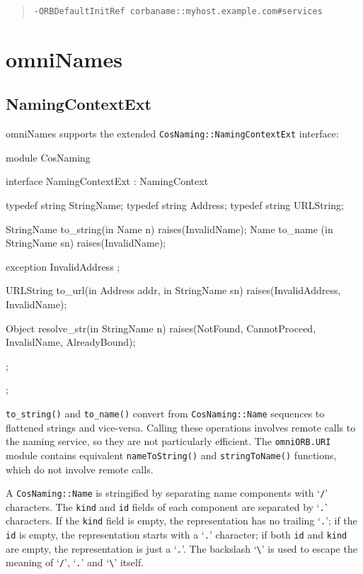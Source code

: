 \documentclass[11pt,oneside,a4paper]{book}
\newcommand{\type}[1]{\texttt{#1}}
\newcommand{\intf}[1]{\texttt{#1}}
\newcommand{\module}[1]{\texttt{#1}}
\newcommand{\code}[1]{\texttt{#1}}
\newcommand{\op}[1]{\texttt{#1()}}
\newcommand{\cmdline}[1]{\texttt{#1}}
\begin{document}
\begin{quote}
\cmdline{-ORBDefaultInitRef corbaname::myhost.example.com\#services}
\end{quote}



\section{omniNames}

\subsection{NamingContextExt}

omniNames supports the extended \intf{CosNaming::NamingContextExt}
interface:

\begin{idllisting}
module CosNaming {
  interface NamingContextExt : NamingContext {
    typedef string StringName;
    typedef string Address;
    typedef string URLString;

    StringName  to_string(in Name n)        raises(InvalidName);
    Name        to_name  (in StringName sn) raises(InvalidName);

    exception InvalidAddress {};

    URLString   to_url(in Address addr, in StringName sn)
      raises(InvalidAddress, InvalidName);

    Object      resolve_str(in StringName n)
      raises(NotFound, CannotProceed, InvalidName, AlreadyBound);
  };
};
\end{idllisting}

\noindent \op{to\_string} and \op{to\_name} convert from
\type{CosNaming::Name} sequences to flattened strings and vice-versa.
Calling these operations involves remote calls to the naming service,
so they are not particularly efficient. The \module{omniORB.URI}
module contains equivalent \op{nameToString} and \op{stringToName}
functions, which do not involve remote calls.

A \type{CosNaming::Name} is stringified by separating name components
with `\texttt{/}' characters. The \code{kind} and \code{id} fields of
each component are separated by `\texttt{.}' characters. If the
\code{kind} field is empty, the representation has no trailing
`\texttt{.}'; if the \code{id} is empty, the representation starts
with a `\texttt{.}' character; if both \texttt{id} and \texttt{kind}
are empty, the representation is just a `\texttt{.}'. The backslash
`\texttt{\textbackslash}' is used to escape the meaning of
`\texttt{/}', `\texttt{.}' and `\texttt{\textbackslash}' itself.
\end{document}
